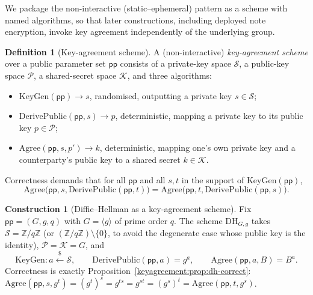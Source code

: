\documentclass[11pt,a4paper]{article}
\theoremstyle{definition}
\newtheorem{definition}[theorem]{Definition}
\newtheorem{construction}[theorem]{Construction}
\theoremstyle{remark}
\newcommand{\Z}{\ensuremath{\mathbb{Z}}}
\begin{document}
We package the non-interactive (static--ephemeral) pattern as a scheme
with named algorithms, so that later constructions, including deployed
note encryption, invoke key agreement independently of the underlying
group.

\begin{definition}[Key-agreement scheme]
\label{keyagreement:def:kascheme}
A (non-interactive) \emph{key-agreement scheme} over a public
parameter set \(\mathsf{pp}\) consists of a private-key space
\(\mathcal{S}\), a public-key space \(\mathcal{P}\), a shared-secret
space \(\mathcal{K}\), and three algorithms:
\begin{itemize}
\item \(\mathrm{KeyGen}(\mathsf{pp}) \to s\), randomised, outputting
  a private key \(s \in \mathcal{S}\);
\item \(\mathrm{DerivePublic}(\mathsf{pp}, s) \to p\), deterministic,
  mapping a private key to its public key \(p \in \mathcal{P}\);
\item \(\mathrm{Agree}(\mathsf{pp}, s, p') \to k\), deterministic,
  mapping one's own private key and a counterparty's public key to a
  shared secret \(k \in \mathcal{K}\).
\end{itemize}
Correctness demands that for all \(\mathsf{pp}\) and all \(s, t\) in
the support of \(\mathrm{KeyGen}(\mathsf{pp})\),
\begin{equation}
\label{keyagreement:eq:correctness}
\mathrm{Agree}\bigl(\mathsf{pp}, s,
  \mathrm{DerivePublic}(\mathsf{pp}, t)\bigr)
=
\mathrm{Agree}\bigl(\mathsf{pp}, t,
  \mathrm{DerivePublic}(\mathsf{pp}, s)\bigr).
\end{equation}
\end{definition}

\begin{construction}[Diffie--Hellman as a key-agreement scheme]
\label{keyagreement:def:dhscheme}
Fix \(\mathsf{pp} = (G, g, q)\) with \(G = \langle g\rangle\) of
prime order \(q\). The scheme \(\mathrm{DH}_{G,g}\) takes
\(\mathcal{S} = \Z/q\Z\) (or \((\Z/q\Z) \setminus \{0\}\), to avoid
the degenerate case whose public key is the identity),
\(\mathcal{P} = \mathcal{K} = G\), and
\[
\mathrm{KeyGen} \colon a \xleftarrow{\$} \mathcal{S},
\qquad
\mathrm{DerivePublic}(\mathsf{pp}, a) = g^{a},
\qquad
\mathrm{Agree}(\mathsf{pp}, a, B) = B^{a}.
\]
Correctness is exactly
Proposition~\ref{keyagreement:prop:dh-correct}:
\(\mathrm{Agree}(\mathsf{pp}, s, g^{t}) = (g^{t})^{s} = g^{ts}
= g^{st} = (g^{s})^{t} = \mathrm{Agree}(\mathsf{pp}, t, g^{s})\).
\end{construction}
\end{document}

